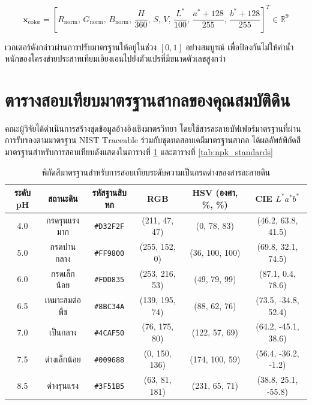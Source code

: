 \begin{equation}
\mathbf{x}_{\text{color}} = \left[ R_{\text{norm}}, \, G_{\text{norm}}, \, B_{\text{norm}}, \, \frac{H}{360}, \, S, \, V, \, \frac{L^*}{100}, \, \frac{a^* + 128}{255}, \, \frac{b^* + 128}{255} \right]^T \in \mathbb{R}^9
\end{equation}

เวกเตอร์ดังกล่าวผ่านการปรับมาตรฐานให้อยู่ในช่วง $[0, 1]$ อย่างสมบูรณ์ เพื่อป้องกันไม่ให้ค่าน้ำหนักของโครงข่ายประสาทเทียมเอียงเอนไปยังตัวแปรที่มีขนาดตัวเลขสูงกว่า

\section{ตารางสอบเทียบมาตรฐานสากลของคุณสมบัติดิน}

คณะผู้วิจัยได้ดำเนินการสร้างชุดข้อมูลอ้างอิงเชิงมาตรวิทยา โดยใช้สารละลายบัฟเฟอร์มาตรฐานที่ผ่านการรับรองตามมาตรฐาน $\text{NIST Traceable}$ ร่วมกับชุดทดสอบเคมีมาตรฐานสากล ได้ผลลัพธ์พิกัดสีมาตรฐานสำหรับการสอบเทียบดังแสดงในตารางที่ \ref{tab:ph_standards} และตารางที่ \ref{tab:npk_standards}

\begin{table}[H]
\centering
\caption{พิกัดสีมาตรฐานสำหรับการสอบเทียบระดับความเป็นกรดด่างของสารละลายดิน}
\label{tab:ph_standards}
\small
\begin{tabularx}{\textwidth}{c c c c c c}
\toprule
\textbf{ระดับ pH} & \textbf{สถานะดิน} & \textbf{รหัสฐานสิบหก} & \textbf{RGB} & \textbf{HSV (องศา, \%, \%)} & \textbf{CIE $L^*a^*b^*$} \\
\midrule
4.0 & กรดรุนแรงมาก & \texttt{\#D32F2F} & (211, 47, 47) & (0, 78, 83) & (46.2, 63.8, 41.5) \\
5.0 & กรดปานกลาง & \texttt{\#FF9800} & (255, 152, 0) & (36, 100, 100) & (69.8, 32.1, 74.5) \\
6.0 & กรดเล็กน้อย & \texttt{\#FDD835} & (253, 216, 53) & (49, 79, 99) & (87.1, 0.4, 78.6) \\
6.5 & เหมาะสมต่อพืช & \texttt{\#8BC34A} & (139, 195, 74) & (88, 62, 76) & (73.5, -34.8, 52.4) \\
7.0 & เป็นกลาง & \texttt{\#4CAF50} & (76, 175, 80) & (122, 57, 69) & (64.2, -45.1, 38.6) \\
7.5 & ด่างเล็กน้อย & \texttt{\#009688} & (0, 150, 136) & (174, 100, 59) & (56.4, -36.2, -1.2) \\
8.5 & ด่างรุนแรง & \texttt{\#3F51B5} & (63, 81, 181) & (231, 65, 71) & (38.8, 25.1, -55.8) \\
\bottomrule
\end{tabularx}
\end{table}

